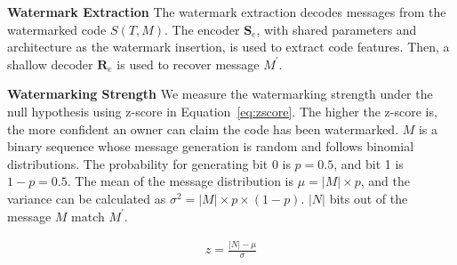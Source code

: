 

\textbf{Watermark Extraction} The watermark extraction decodes messages from the watermarked code $S(T, M)$. The encoder $\textbf{S}_e$, with shared parameters and architecture as the watermark insertion, is used to extract code features. Then, a shallow decoder $\textbf{R}_e$ is used to recover message $M^\prime$.

\textbf{Watermarking Strength} We measure the watermarking strength under the null hypothesis using z-score in Equation~\ref{eq:zscore}. The higher the z-score is, the more confident an owner can claim the code has been watermarked. $M$ is a binary sequence whose message generation is random and follows binomial distributions. The probability for generating bit 0 is $p=0.5$, and bit 1 is $1-p = 0.5$. The mean of the message distribution is $\mu= |M| \times p$, and the variance can be calculated as $ \sigma^2= |M| \times p \times(1-p)$. $|N|$ bits out of the message $M$ match $M^\prime$. 

 \vspace{-5pt}
\begin{equation}
\begin{aligned}\label{eq:zscore}
z=\frac{|N|-\mu}{\sigma}
\end{aligned}
\end{equation}
 \vspace{-5pt}


